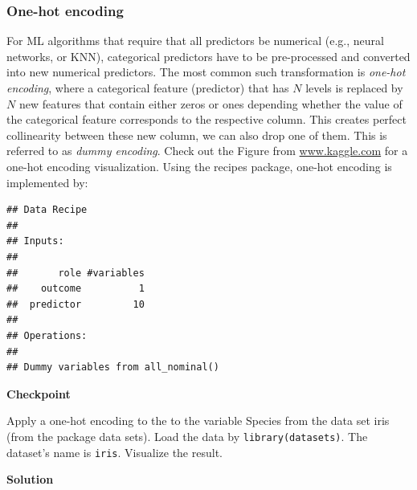 \documentclass[
]{book}
\newenvironment{Shaded}{\begin{snugshade}}{\end{snugshade}}
\newcommand{\DataTypeTok}[1]{\textcolor[rgb]{0.13,0.29,0.53}{#1}}
\newcommand{\KeywordTok}[1]{\textcolor[rgb]{0.13,0.29,0.53}{\textbf{#1}}}
\newcommand{\NormalTok}[1]{#1}
\newcommand{\OperatorTok}[1]{\textcolor[rgb]{0.81,0.36,0.00}{\textbf{#1}}}
\newcommand{\OtherTok}[1]{\textcolor[rgb]{0.56,0.35,0.01}{#1}}
\newcommand{\StringTok}[1]{\textcolor[rgb]{0.31,0.60,0.02}{#1}}
\begin{document}
\hypertarget{one-hot-encoding}{%
\subsubsection{One-hot encoding}\label{one-hot-encoding}}

For ML algorithms that require that all predictors be numerical (e.g., neural networks, or KNN), categorical predictors have to be pre-processed and converted into new numerical predictors. The most common such transformation is \emph{one-hot encoding}, where a categorical feature (predictor) that has \(N\) levels is replaced by \(N\) new features that contain either zeros or ones depending whether the value of the categorical feature corresponds to the respective column. This creates perfect collinearity between these new column, we can also drop one of them. This is referred to as \emph{dummy encoding}.
Check out the Figure from \href{https://www.kaggle.com/dansbecker/using-categorical-data-with-one-hot-encoding}{www.kaggle.com} for a one-hot encoding visualization. Using the recipes package, one-hot encoding is implemented by:

\begin{Shaded}
\end{Shaded}

\begin{verbatim}
## Data Recipe
## 
## Inputs:
## 
##       role #variables
##    outcome          1
##  predictor         10
## 
## Operations:
## 
## Dummy variables from all_nominal()
\end{verbatim}

\textbf{Checkpoint}

Apply a one-hot encoding to the to the variable Species from the data set iris (from the package data sets). Load the data by \texttt{library(datasets)}. The dataset's name is \texttt{iris}. Visualize the result.

\textbf{Solution}

\begin{Shaded}
\end{Shaded}
\end{document}
